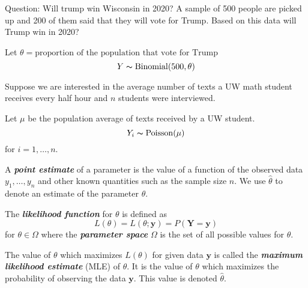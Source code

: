 \begin{exbox}
    \begin{example}
        Question: Will trump win Wisconsin in 2020? A sample of 500 people
        are picked up and 200 of them said that they will vote for Trump. Based
        on this data will Trump win in 2020?

        Let $ \theta=\text{proportion of the population that vote for Trump} $
        \[ Y \thicksim \operatorname{Binomial}(500,\theta) \]
    \end{example}
\end{exbox}

\begin{exbox}
    \begin{example}
        Suppose we are interested in the average number of texts a UW math student
        receives every half hour and $ n $ students were interviewed.

        Let $ \mu $ be the population average of texts received by a UW student.
        \[ Y_i \thicksim \operatorname{Poisson}(\mu) \]
        for $ i=1,\ldots ,n $.
    \end{example}
\end{exbox}

\begin{defbox}
    \begin{definition}
        A \textbf{\emph{point estimate}} of a parameter is the value of a function
        of the observed data $ y_1,\ldots ,y_n $ and other known quantities such as
        the sample size $ n $. We use $ \hat{\theta} $ to denote an estimate
        of the parameter $ \theta $.
    \end{definition}
\end{defbox}

\begin{defbox}
    \begin{definition}
        The \textbf{\emph{likelihood function}} for $ \theta $ is defined as
        \[ L(\theta)=L(\theta;\bm{y})=P(\bm{Y}=\bm{y}) \]
        for $ \theta\in\Omega $ where the \textbf{\emph{parameter space}} $ \Omega $
        is the set of all possible values for $ \theta $.
    \end{definition}
\end{defbox}

\begin{defbox}
    \begin{definition}
        The value of $ \theta $ which maximizes $ L(\theta) $ for given data $ \bm{y} $
        is called the \textbf{\emph{maximum likelihood estimate}} (MLE) of $ \theta $.
        It is the value of $ \theta $ which maximizes the probability of observing the data
        $ \bm{y} $. This value is denoted $ \hat{\theta} $.
    \end{definition}
\end{defbox}

